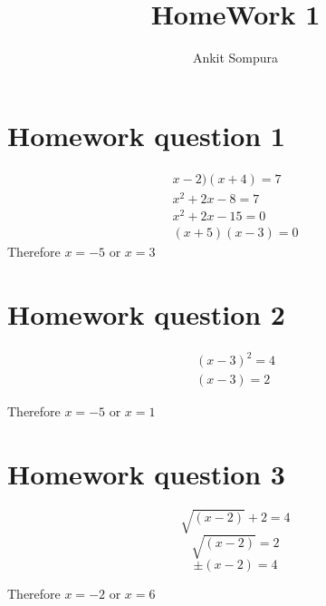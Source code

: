 \documentclass[11pt]{article}
\title{HomeWork 1}
\author{Ankit Sompura}
\begin{document}
\maketitle

\section{Homework question 1}

\begin{align*}
x-2)(x+4)=7 \\
x^2+2x-8=7 \\
x^2+2x-15=0 \\ 
(x+5)(x-3)=0 
\end{align*}
 Therefore $x = -5$ or $x = 3$ 


\section{Homework question 2}

\begin{align*}
(x-3)^2 = 4\\
(x-3) = 2
\end{align*}

Therefore $x = -5$ or $x = 1$ 

\section{Homework question 3}


$$\sqrt{(x-2)} + 2 = 4$$
$$\sqrt{(x-2)} = 2$$
$$\pm (x-2) = 4$$

Therefore $x = -2$ or $x = 6$
\end{document}
